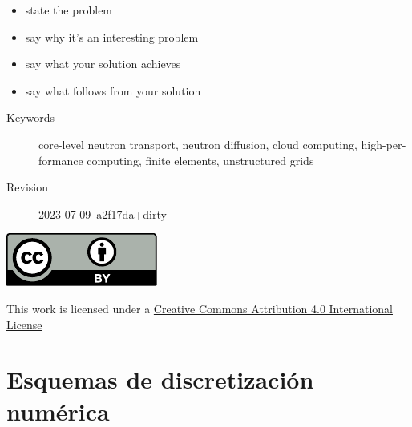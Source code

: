 \documentclass[
  12pt,
  a4paper,
  table]{scrbook}
\providecommand{\tightlist}{%
  \setlength{\itemsep}{0pt}\setlength{\parskip}{0pt}}\usepackage{longtable,booktabs,array}
\renewcommand*\contentsname{Tabla de contenidos}
\newcommand\contentsname{Tabla de contenidos}
\theoremstyle{plain}
\theoremstyle{definition}
\theoremstyle{plain}
\theoremstyle{plain}
\theoremstyle{remark}
\begin{document}
\vspace{0.75cm plus 0.5cm}

\begin{otherlanguage}{american}

\begin{itemize}
\tightlist
\item
  state the problem
\item
  say why it's an interesting problem
\item
  say what your solution achieves
\item
  say what follows from your solution
\end{itemize}

\end{otherlanguage}

\vspace{\fill}

\begin{otherlanguage}{american}

\begin{description}
\item[Keywords]
core-level neutron transport, neutron diffusion, cloud computing,
high-performance computing, finite elements, unstructured grids
\item[Revision]
2023-07-09--a2f17da+dirty
\end{description}

\end{otherlanguage}

\vspace{1.5cm plus 0.5cm minus 0.5cm}

\begin{centering}

\includegraphics{front/by.pdf}

This work is licensed under a
\href{http://creativecommons.org/licenses/by/4.0/\%22}{Creative Commons
Attribution 4.0 International License}

\end{centering}

\newpage
\renewcommand*\contentsname{Tabla de contenidos}
\tableofcontents
\mainmatter


\hypertarget{sec-esquemas}{%
\chapter{Esquemas de discretización numérica}\label{sec-esquemas}}
\end{document}
